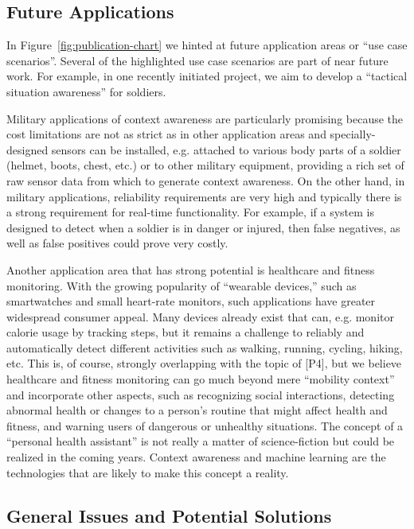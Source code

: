 \subsection{Future Applications}
\label{sec:future_applications}

In Figure~\ref{fig:publication-chart} we hinted at future application areas or ``use case scenarios''. Several of the highlighted use case scenarios are part of near future work. For example, in one recently initiated project, we aim to develop a ``tactical situation awareness'' for soldiers.

Military applications of context awareness are particularly promising because the cost limitations are not as strict as in other application areas and specially-designed sensors can be installed, e.g. attached to various body parts of a soldier (helmet, boots, chest, etc.) or to other military equipment, providing a rich set of raw sensor data from which to generate context awareness. On the other hand, in military applications, reliability requirements are very high and typically there is a strong requirement for real-time functionality. For example, if a system is designed to detect when a soldier is in danger or injured, then false negatives, as well as false positives could prove very costly.

Another application area that has strong potential is healthcare and fitness monitoring. With the growing popularity of ``wearable devices,'' such as smartwatches and small heart-rate monitors, such applications have greater widespread consumer appeal. Many devices already exist that can, e.g. monitor calorie usage by tracking steps, but it remains a challenge to reliably and automatically detect different activities such as walking, running, cycling, hiking, etc. This is, of course, strongly overlapping with the topic of [P4], but we believe healthcare and fitness monitoring can go much beyond mere ``mobility context'' and incorporate other aspects, such as recognizing social interactions, detecting abnormal health or changes to a person's routine that might affect health and fitness, and warning users of dangerous or unhealthy situations. The concept of a ``personal health assistant'' is not really a matter of science-fiction but could be realized in the coming years. Context awareness and machine learning are the technologies that are likely to make this concept a reality.

\subsection{General Issues and Potential Solutions}
\label{sec:general_issues}


